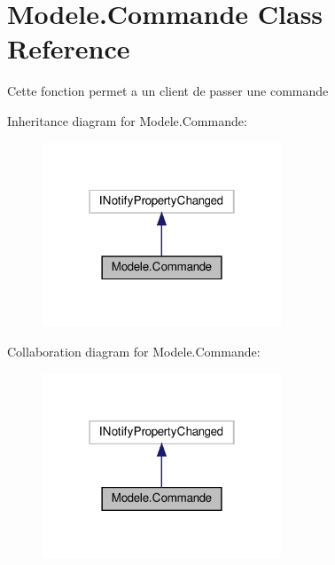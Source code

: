 \hypertarget{classModele_1_1Commande}{}\section{Modele.\+Commande Class Reference}
\label{classModele_1_1Commande}


Cette fonction permet a un client de passer une commande  




Inheritance diagram for Modele.\+Commande\+:
\nopagebreak
\begin{figure}[H]
\begin{center}
\leavevmode
\includegraphics[width=202pt]{classModele_1_1Commande__inherit__graph}
\end{center}
\end{figure}


Collaboration diagram for Modele.\+Commande\+:
\nopagebreak
\begin{figure}[H]
\begin{center}
\leavevmode
\includegraphics[width=202pt]{classModele_1_1Commande__coll__graph}
\end{center}
\end{figure}
